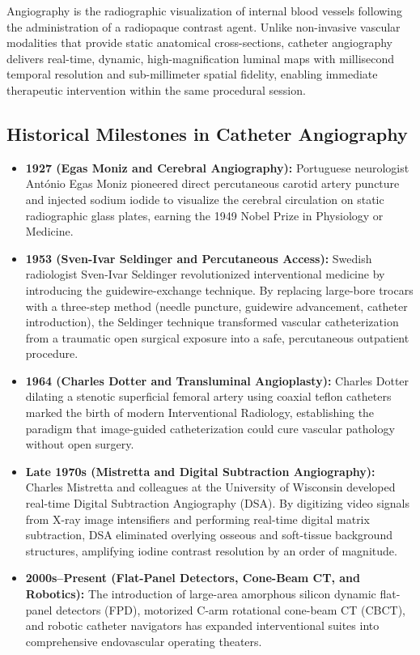 \documentclass[11pt,a4paper]{article}
\begin{document}
Angiography is the radiographic visualization of internal blood vessels following the administration of a radiopaque contrast agent. Unlike non-invasive vascular modalities that provide static anatomical cross-sections, catheter angiography delivers real-time, dynamic, high-magnification luminal maps with millisecond temporal resolution and sub-millimeter spatial fidelity, enabling immediate therapeutic intervention within the same procedural session.

\subsection{Historical Milestones in Catheter Angiography}

\begin{itemize}[leftmargin=*]
    \item \textbf{1927 (Egas Moniz and Cerebral Angiography):} Portuguese neurologist António Egas Moniz pioneered direct percutaneous carotid artery puncture and injected sodium iodide to visualize the cerebral circulation on static radiographic glass plates, earning the 1949 Nobel Prize in Physiology or Medicine.
    \item \textbf{1953 (Sven-Ivar Seldinger and Percutaneous Access):} Swedish radiologist Sven-Ivar Seldinger revolutionized interventional medicine by introducing the guidewire-exchange technique. By replacing large-bore trocars with a three-step method (needle puncture, guidewire advancement, catheter introduction), the Seldinger technique transformed vascular catheterization from a traumatic open surgical exposure into a safe, percutaneous outpatient procedure.
    \item \textbf{1964 (Charles Dotter and Transluminal Angioplasty):} Charles Dotter dilating a stenotic superficial femoral artery using coaxial teflon catheters marked the birth of modern Interventional Radiology, establishing the paradigm that image-guided catheterization could cure vascular pathology without open surgery.
    \item \textbf{Late 1970s (Mistretta and Digital Subtraction Angiography):} Charles Mistretta and colleagues at the University of Wisconsin developed real-time Digital Subtraction Angiography (DSA). By digitizing video signals from X-ray image intensifiers and performing real-time digital matrix subtraction, DSA eliminated overlying osseous and soft-tissue background structures, amplifying iodine contrast resolution by an order of magnitude.
    \item \textbf{2000s--Present (Flat-Panel Detectors, Cone-Beam CT, and Robotics):} The introduction of large-area amorphous silicon dynamic flat-panel detectors (FPD), motorized C-arm rotational cone-beam CT (CBCT), and robotic catheter navigators has expanded interventional suites into comprehensive endovascular operating theaters.
\end{itemize}
\end{document}
